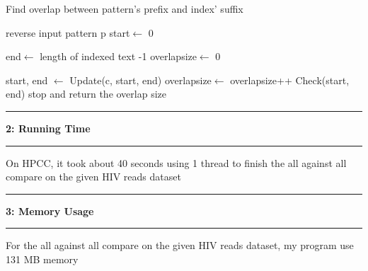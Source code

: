 \documentclass[11pt]{article}
\newcommand\question[2]{\vspace{.25in}\hrule\textbf{#1: #2}\vspace{.5em}\hrule\vspace{.10in}}
\begin{document}
\begin{algorithm}[H]
	\caption{Find overlap between pattern's prefix and index' suffix}\label{overlap}
	\begin{algorithmic}[1]
		\State reverse input pattern p
		\State start$ \gets $ 0
		
		\State end$ \gets $ length of indexed text -1
		\State overlapsize$ \gets $ 0
		
		\State start, end $ \gets $ Update(c, start, end)
		\State overlapsize$ \gets $ overlapsize++
		\State Check(start, end)
		 stop and return the overlap size
		\EndIf
		\EndIf
		\EndFor
		\EndFunction
		
	\end{algorithmic}
\end{algorithm}

\question{2}{Running Time}

On HPCC, it took about 40 seconds using 1 thread to finish the all against all compare on the given HIV reads dataset

\question{3}{Memory Usage}
For the all against all compare on the given HIV reads dataset, my program use 131 MB memory
\end{document}
